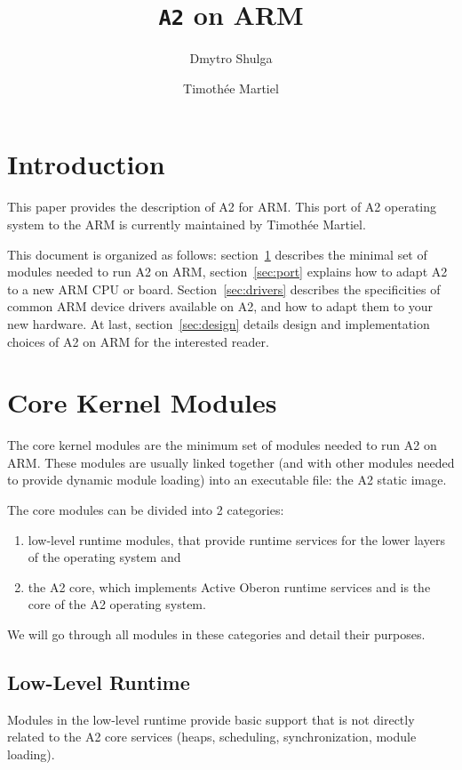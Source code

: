 \documentclass[a4paper]{article}
\title{\texttt{A2} on ARM}
\author{Dmytro Shulga \and Timothée Martiel}
\begin{document}
\maketitle

\tableofcontents

\section*{Introduction}
This paper provides the description of A2 for ARM. This port of  A2 operating
system to the ARM is currently maintained by Timothée Martiel.

This document is organized as follows: section~\ref{sec:core} describes the
minimal set of modules needed to run A2 on ARM, section~\ref{sec:port} explains
how to adapt A2 to a new ARM CPU or board. Section~\ref{sec:drivers} describes
the specificities of common ARM device drivers available on A2, and how to adapt
them to your new hardware. At last, section~\ref{sec:design} details design and
implementation choices of A2 on ARM for the interested reader.

\section{Core Kernel Modules}
\label{sec:core}
The core kernel modules are the minimum set of modules needed to run A2 on ARM.
These modules are usually linked together (and with other modules needed to
provide dynamic module loading) into an executable file: the A2 static image.

The core modules can be divided into 2 categories:
\begin{enumerate}
    \item low-level runtime modules, that provide runtime services for the lower
        layers of the operating system and
    \item the A2 core, which implements Active Oberon runtime services and is
        the core of the A2 operating system.
\end{enumerate}
We will go through all modules in these categories and detail their purposes.

\subsection{Low-Level Runtime}
Modules in the low-level runtime provide basic support that is not directly
related to the A2 core services (heaps, scheduling, synchronization, module
loading).
\end{document}
